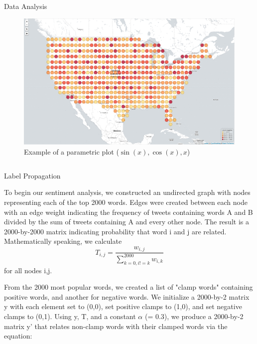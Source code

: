 \documentclass[final]{beamer}
\newlength{\onecolwid}
\newlength{\twocolwid}
\begin{document}
\begin{frame}[t]
\begin{columns}[t]
\begin{column}{\twocolwid}
\begin{block}{Data Analysis}
\begin{figure}[h]


\begin{center}\includegraphics[width=0.8\linewidth]{happyMap} \end{center}
\caption{Example of a parametric plot ($\sin (x), \cos(x), x$)}
\end{figure}
\end{block} 

\begin{columns}[t,totalwidth=\twocolwid] %

\begin{column}{\onecolwid}\vspace{-.6in} %


\begin{block}{Label Propagation}

To begin our sentiment analysis, we constructed an undirected graph with nodes representing each of the top 2000 words. Edges were created between each node with an edge weight indicating the frequency of tweets containing words A and B divided by the sum of tweets containing A and every other node. The result is a 2000-by-2000 matrix indicating probability that word i and j are related. Mathematically speaking, 
we calculate 
\begin{equation}
T_{i,j} = \frac{w_{i,j}}{\sum_{k=0, i!=k}^{2000} w_{i,k}}
\end{equation}
for all nodes i,j. 

From the 2000 most popular words, we created a list of "clamp words" containing positive words, and another for negative words.  We initialize a 2000-by-2 matrix y with each element set to (0,0), set positive clamps to (1,0), and set negative clamps to (0,1). Using y, T, and a constant $\alpha$ (= 0.3), we produce a 2000-by-2 matrix y' that relates non-clamp words with their clamped words via the equation:


\end{block}
\end{column}
\end{columns}
\end{column}
\end{columns}
\end{frame}
\end{document}
